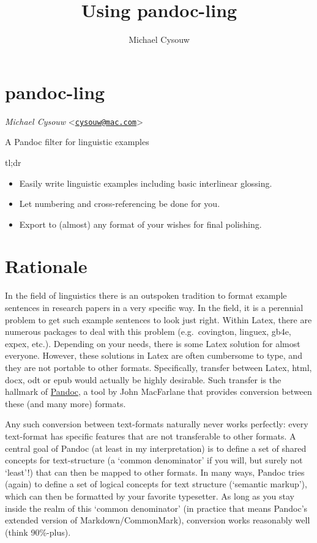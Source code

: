 \documentclass[
]{article}
\title{Using pandoc-ling}
\author{Michael Cysouw}
\date{}
\providecommand{\tightlist}{%
  \setlength{\itemsep}{0pt}\setlength{\parskip}{0pt}}
\begin{document}
\maketitle

{
\setcounter{tocdepth}{3}
\tableofcontents
}
\hypertarget{pandoc-ling}{%
\section{pandoc-ling}\label{pandoc-ling}}

\emph{Michael Cysouw}
\textless{}\href{mailto:cysouw@mac.com}{\nolinkurl{cysouw@mac.com}}\textgreater{}

A Pandoc filter for linguistic examples

tl;dr

\begin{itemize}
\tightlist
\item
  Easily write linguistic examples including basic interlinear glossing.
\item
  Let numbering and cross-referencing be done for you.
\item
  Export to (almost) any format of your wishes for final polishing.
\end{itemize}

\hypertarget{rationale}{%
\section{Rationale}\label{rationale}}

In the field of linguistics there is an outspoken tradition to format
example sentences in research papers in a very specific way. In the
field, it is a perennial problem to get such example sentences to look
just right. Within Latex, there are numerous packages to deal with this
problem (e.g.~covington, linguex, gb4e, expex, etc.). Depending on your
needs, there is some Latex solution for almost everyone. However, these
solutions in Latex are often cumbersome to type, and they are not
portable to other formats. Specifically, transfer between Latex, html,
docx, odt or epub would actually be highly desirable. Such transfer is
the hallmark of \href{https://pandoc.org}{Pandoc}, a tool by John
MacFarlane that provides conversion between these (and many more)
formats.

Any such conversion between text-formats naturally never works
perfectly: every text-format has specific features that are not
transferable to other formats. A central goal of Pandoc (at least in my
interpretation) is to define a set of shared concepts for text-structure
(a `common denominator' if you will, but surely not `least'!) that can
then be mapped to other formats. In many ways, Pandoc tries (again) to
define a set of logical concepts for text structure (`semantic markup'),
which can then be formatted by your favorite typesetter. As long as you
stay inside the realm of this `common denominator' (in practice that
means Pandoc's extended version of Markdown/CommonMark), conversion
works reasonably well (think 90\%-plus).
\end{document}

